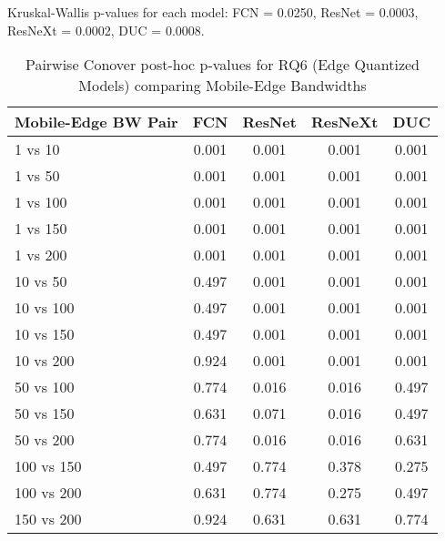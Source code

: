 \begin{table}[h]
\centering
\caption{Pairwise Conover post-hoc p-values for RQ6 (Edge Quantized Models) comparing Mobile-Edge Bandwidths}
\label{tab:conover_edge_quantized}
\smallskip
Kruskal-Wallis p-values for each model: FCN = 0.0250, ResNet = 0.0003, ResNeXt = 0.0002, DUC = 0.0008.

\begin{tabular}{lcccc}
\toprule
Mobile-Edge BW Pair & FCN & ResNet & ResNeXt & DUC \\
\midrule
1 vs 10 & 0.001 & 0.001 & 0.001 & 0.001 \\
1 vs 50 & 0.001 & 0.001 & 0.001 & 0.001 \\
1 vs 100 & 0.001 & 0.001 & 0.001 & 0.001 \\
1 vs 150 & 0.001 & 0.001 & 0.001 & 0.001 \\
1 vs 200 & 0.001 & 0.001 & 0.001 & 0.001 \\
10 vs 50 & 0.497 & 0.001 & 0.001 & 0.001 \\
10 vs 100 & 0.497 & 0.001 & 0.001 & 0.001 \\
10 vs 150 & 0.497 & 0.001 & 0.001 & 0.001 \\
10 vs 200 & 0.924 & 0.001 & 0.001 & 0.001 \\
50 vs 100 & 0.774 & 0.016 & 0.016 & 0.497 \\
50 vs 150 & 0.631 & 0.071 & 0.016 & 0.497 \\
50 vs 200 & 0.774 & 0.016 & 0.016 & 0.631 \\
100 vs 150 & 0.497 & 0.774 & 0.378 & 0.275 \\
100 vs 200 & 0.631 & 0.774 & 0.275 & 0.497 \\
150 vs 200 & 0.924 & 0.631 & 0.631 & 0.774 \\
\bottomrule
\end{tabular}
\end{table}

